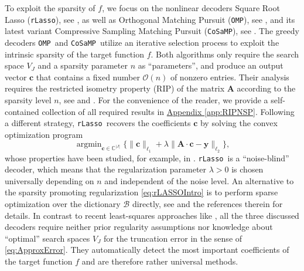 \documentclass[11pt,reqno, a4paper]{article}
\numberwithin{equation}{section}
\newcommand{\rlasso}{\texttt{rLasso}}
\newcommand{\omp}{\texttt{OMP}}
\newcommand{\cosamp}{\texttt{CoSaMP}}
\DeclareMathOperator*{\argmin}{argmin}
\begin{document}
To exploit the sparsity of $f$, we focus on the nonlinear decoders Square Root Lasso (\rlasso), see \cite{ABB19,BeCheWa11,BBH24,PeJu22}, as well as Orthogonal Matching Pursuit (\omp), see \cite{DaTe24,KuRa08,Zha11}, and its latest variant Compressive Sampling Matching Pursuit (\cosamp), see \cite{NeeTr09}.
The greedy decoders \omp \ and \cosamp \ utilize an iterative selection process to exploit the intrinsic sparsity of the target function $f$.
Both algorithms only require the search space $V_J$ and a sparsity parameter $n$ as \enquote{parameters}, and produce an output vector $\mathbf c$ that  contains a fixed number $\mathcal O(n)$ of nonzero entries.
Their analysis requires the restricted isometry property (RIP) of the matrix $\mathbf A$ according to the sparsity level $n$, see \cite[Chapt.\ 6]{FoRa13} and \cite{Zha11}.
For the convenience of the reader, we provide a self-contained collection of all required results in \hyperref[app:RIPNSP]{Appendix \ref*{app:RIPNSP}}. 
Following a different strategy, \rlasso\ recovers the coefficients $\mathbf c$ by solving the convex optimization program
\begin{equation} \label{eq:rLASSOIntro}
    \argmin_{\mathbf{c} \in \mathbb{C}^{|J|}} \bigl\{\lVert\mathbf{c}\rVert_{\ell_1} + \lambda\lVert\mathbf{A\cdot c - \mathbf{y}}\rVert_{\ell_2}\bigr\},
\end{equation}
whose properties have been studied, for example, in \cite{ABB19,AdcockBrugWebster22,BeCheWa11,PeJu22}.
\rlasso \ is a ``noise-blind'' decoder, which means that the regularization parameter $\lambda>0$ is chosen universally depending on $n$ and independent of the noise level.
An alternative to the sparsity promoting regularization \eqref{eq:rLASSOIntro} is to perform sparse optimization over the dictionary $\mathcal B$ directly, see \cite{HerNeu2025} and the references therein for details.  
In contrast to recent least-squares approaches like \cite{DKU23, KamUllVol2021, KrUl21, NSU22}, all the three discussed decoders require neither prior regularity assumptions nor knowledge about \enquote{optimal} search spaces $V_J$ for the truncation error in the sense of \eqref{eq:ApproxError}.
They  automatically detect the most important coefficients of the target function $f$ and are therefore rather universal methods.
\end{document}
